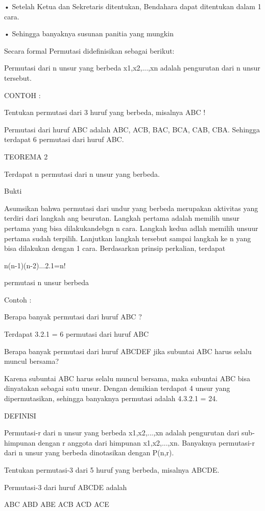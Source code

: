 \documentclass[11pt,fleqn]{book} %
\begin{document}
• Setelah Ketua dan Sekretaris ditentukan, Bendahara dapat ditentukan dalam 1 cara.

 
• Sehingga banyaknya susunan panitia yang mungkin


Secara formal Permutasi didefinisikan sebagai berikut:


Permutasi dari n unsur yang berbeda x1,x2,...,xn adalah pengurutan dari n unsur tersebut.


CONTOH :


Tentukan permutasi dari 3 huruf yang berbeda, misalnya ABC !


Permutasi dari huruf ABC adalah ABC, ACB, BAC, BCA, CAB, CBA. Sehingga terdapat 6 permutasi dari huruf ABC.

TEOREMA 2


Terdapat n permutasi dari n unsur yang berbeda.


Bukti


Asumsikan bahwa permutasi dari undur yang berbeda merupakan aktivitas yang terdiri dari langkah ang beurutan. Langkah pertama adalah memilih unsur pertama yang bisa dilakukandebgn n cara. Langkah kedua adlah memilih unsuur pertama sudah terpilih. Lanjutkan langkah tersebut sampai langkah ke n yang bisa dilakukan dengan 1 cara. Berdasarkan prinsip perkalian, terdapat


n(n-1)(n-2)...2.1=n!


permutasi n unsur berbeda

Contoh :


Berapa banyak permutasi dari huruf ABC ?


Terdapat 3.2.1 = 6 permutasi dari huruf ABC

Berapa banyak permutasi dari huruf ABCDEF jika subuntai ABC harus selalu muncul bersama?


Karena subuntai ABC harus selalu muncul bersama, maka subuntai ABC bisa dinyatakan sebagai satu unsur. Dengan demikian terdapat 4 unsur yang dipermutasikan, sehingga banyaknya permutasi adalah 4.3.2.1 = 24.

DEFINISI


Permutasi-r dari n unsur yang berbeda x1,x2,...,xn adalah pengurutan dari sub-himpunan dengan r anggota dari himpunan {x1,x2,...,xn}. Banyaknya permutasi-r dari n unsur yang berbeda dinotasikan dengan P(n,r).

Tentukan permutasi-3 dari 5 huruf yang berbeda, misalnya ABCDE.


Permutasi-3 dari huruf ABCDE adalah

ABC ABD ABE ACB ACD ACE 
\end{document}
